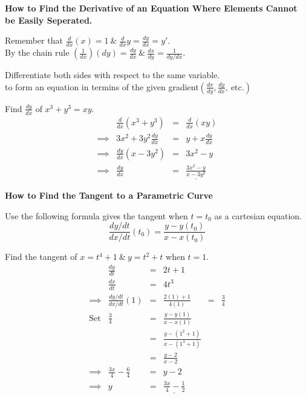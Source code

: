 \documentclass[11pt,a4paper]{article}
\begin{document}
\textbf{How to Find the Derivative of an Equation Where Elements Cannot be Easily Seperated.}\\

\subtitle{Theory}
Remember that $\frac{d}{dx}(x) = 1\ \&\ \frac{d}{dx} y = \frac{dy}{dx}  = y'$.\\
By the chain rule $\left(\frac{1}{dx}\right)(dy) = \frac{dy}{dx}\ \&\ \frac{dx}{dy} = \frac{1}{dy/dx}$.\\

\subtitle{Process}
Differentiate both sides with respect to the same variable.\\
 to form an equation in termins of the given gradient$\left(\frac{dx}{dy}, \frac{dy}{dx},\ \mathrm{etc.}\right)$

\subtitle{Example}
Find $\frac{dy}{dx}$ of $x^3 + y^3 = xy$.
\[\begin{array}{rrcl}
& \frac{d}{dx}\left(x^3 + y^3\right) &=& \frac{d}{dx}\left(xy\right)\\
\implies& 3x^2 + 3y^2\frac{dy}{dx} &=& y + x\frac{dy}{dx}\\
\implies& \frac{dy}{dx}\left(x - 3y^2\right) &=& 3x^2 - y\\
\implies& \displaystyle{\frac{dy}{dx}} &=& \displaystyle{\underline{\frac{3x^2-y}{x-3y^2}}}
\end{array}\]

\textbf{How to Find the Tangent to a Parametric Curve}\\

\subtitle{Process}
Use the following formula gives the tangent when $t = t_0$ as a cartesian equation.
$$\displaystyle{\frac{dy/dt}{dx/dt}}(t_0) = \displaystyle{\frac{y - y(t_0)}{x-x(t_0)}}$$

\subtitle{Example}
Find the tangent of $x = t^4 + 1\ \&\ y=t^2+t$ when $t = 1$.
\[\begin{array}{rrclcl}
&\frac{dy}{dt} &=& 2t + 1\\
&\frac{dx}{dt} &=& 4t^3\\
\implies&\frac{dy/dt}{dx/dt}(1) &=& \frac{2(1) + 1}{4(1)} &=& \frac{3}{4}\\
\mathrm{Set}&\frac{3}{4} &=& \frac{y-y(1)}{x-x(1)}\\
&&=& \frac{y - (1^2 + 1)}{x - (1^4 + 1)}\\
&&=& \frac{y-2}{x-2}\\
\implies& \frac{3x}{4} - \frac{6}{4} &=& y - 2\\
\implies& y &=& \underline{\frac{3x}{4} - \frac{1}{2}}
\end{array}\]
\end{document}

